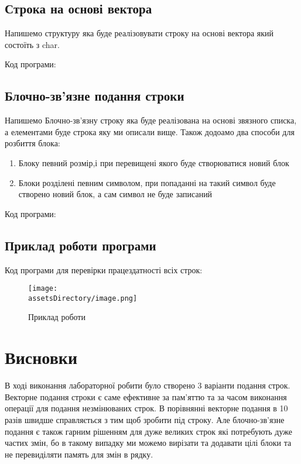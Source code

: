 \newpage
\subsection{Строка на основі вектора}
Напишемо структуру яка буде реалізовувати строку на основі вектора який состоїть з char.

\noindent
Код програми:



\newpage
\subsection{Блочно-зв’язне подання строки}
Напишемо Блочно-зв’язну строку яка буде реалізована на основі звязного списка, а елементами буде строка яку ми описали вище.
Також додоамо два способи для розбиття блока:
\begin{enumerate}
    \item Блоку певний розмір,і при перевищені якого буде створюватися новий блок
    \item Блоки розділені певним символом, при попаданні на такий символ буде створено новий блок, а сам символ не буде записаний
\end{enumerate}

\noindent
Код програми:




\newpage
\subsection{Приклад роботи програми}
\noindent
Код програми для перевірки працездатності всіх строк:




\begin{figure}[ht!]
    \centering
    \texttt{[image: \\assetsDirectory/image.png]}
    \caption{Приклад роботи}
\end{figure}


\newpage
\section{Висновки}
В ході виконання лабораторної робити було створено 3 варіанти подання строк.
Векторне подання строки є саме ефективне за пам'яттю та за часом виконання операції для подання незмінюваних строк.
В порівнянні векторне подання в 10 разів швидше справляється з тим щоб зробити під строку.
Але блочно-зв’язне подання є також гарним рішенням для дуже великих строк які потребують дуже частих змін,
бо в такому випадку ми можемо вирізати та додавати цілі блоки та не перевиділяти память для змін в рядку.
